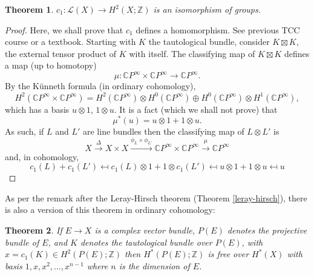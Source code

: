 \documentclass[a4paper,10pt]{article}
\theoremstyle{plain}%
\newtheorem{thm}{Theorem}
\theoremstyle{definition}
\theoremstyle{remark}
\newcommand{\ZZ}{\mathbb{Z}}
\newcommand{\CC}{\mathbb{C}}
\newcommand{\cp}{\CC P}   %
\newcommand{\CPi}{\cp^\infty}
\newcommand{\xto}[1]{\xrightarrow{#1}}
\begin{document}
\begin{thm}
  $c_1: \mathcal{L}(X) \to H^2(X;\ZZ)$ is an isomorphism of groups.
\end{thm}
\begin{proof}
  Here, we shall prove that $c_1$ defines a homomorphism. See previous
  TCC course or a textbook.
  Starting with $K$ the tautological bundle, consider $K \boxtimes K$,
  the external tensor product of $K$ with itself. The classifying map
  of $K\boxtimes K$ defines a map (up to homotopy)
  \begin{equation*}
    \mu: \CPi\times\CPi \to \CPi.
  \end{equation*}
  By the K\"unneth formula (in ordinary cohomology),
  \begin{equation*}
    H^2(\CPi\times \CPi) = H^2(\CPi)\otimes H^0(\CPi) \oplus
    H^0(\CPi)\otimes H^1(\CPi),
  \end{equation*}
  which has a basis $u\otimes 1$, $1 \otimes u$. It is a fact (which
  we shall not prove) that
  \begin{equation*}
    \mu^*(u) = u\otimes 1 + 1 \otimes u.
  \end{equation*}
  As such, if $L$ and $L'$ are line bundles then the classifying
  map of $L\otimes L'$ is
  \begin{equation*}
    X \xto{\Delta} X\times X \xto{\phi_{L}\times \phi_{L'}}
    \CPi\times \CPi \xto{\mu} \CPi
  \end{equation*}
  and, in cohomology,
  \begin{equation*}
    c_1(L) + c_1(L') \mapsfrom
    c_1(L)\otimes 1 + 1 \otimes c_1(L') \mapsfrom
    u\otimes 1 + 1 \otimes u \mapsfrom u
  \end{equation*}
\end{proof}

As per the remark after the Leray-Hirsch theorem (Theorem
\ref{leray-hirsch}), there is also a version of this theorem in
ordinary cohomology:
\begin{thm}
  If $E \to X$ is a complex vector bundle, $P(E)$ denotes the
  projective bundle of $E$, and $K$ denotes the tautological bundle
  over $P(E)$, with $x = c_1(K)\in H^2(P(E);\ZZ)$ then $H^*(P(E);\ZZ)$
  is free over $H^*(X)$ with basis $1,x,x^2,\dots ,x^{n-1}$ where $n$
  is the dimension of $E$.
\end{thm}
\end{document}

